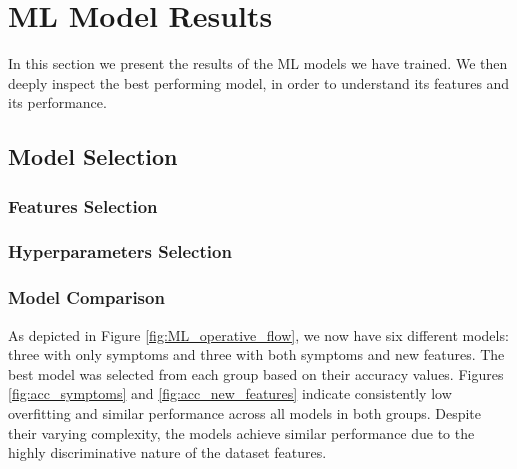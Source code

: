 \section{ML Model Results}
\label{sec:results_ML}
In this section we present the results of the ML models we have trained. We then deeply inspect the best performing model, 
in order to understand its features and its performance.



\subsection{Model Selection}
\label{subsec:results_ML_model_selection}

\subsubsection*{Features Selection}

\subsubsection*{Hyperparameters Selection}


\subsubsection*{Model Comparison} \label{subsubsec:results_ML_model_comparison}

As depicted in Figure \ref{fig:ML_operative_flow}, we now have six different models: three with only symptoms 
and three with both symptoms and new features. The best model was selected from each group based on their accuracy 
values. Figures \ref{fig:acc_symptoms} and \ref{fig:acc_new_features} indicate consistently low overfitting 
and similar performance across all models in both groups. Despite their varying complexity, the models achieve 
similar performance due to the highly discriminative nature of the dataset features.

